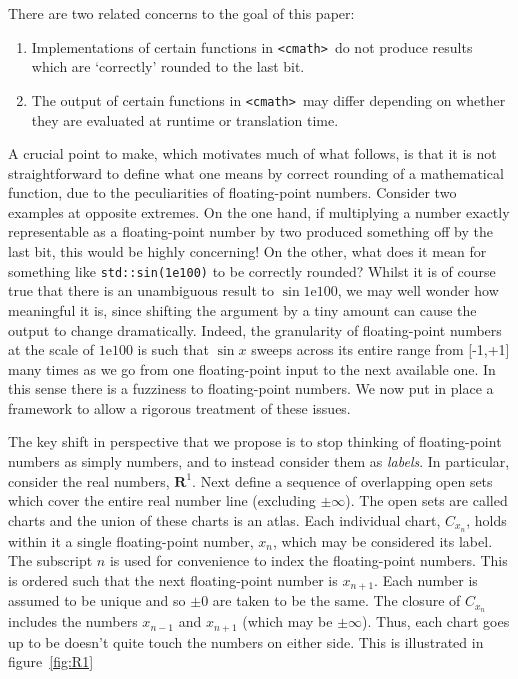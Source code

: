 \documentclass[prd,twocolumn,amsmath,amssymb,nofootinbib,eqsecnum]{revtex4-1}
\newcommand{\code}[1]{{\tt #1}}
\newcommand{\header}[1]{{\tt <#1>}}
\newcommand{\cmath}{\header{cmath}}
\newcommand{\fig}[1]{figure~\ref{fig:#1}}
\begin{document}
There are two related concerns to the goal of this paper:
\begin{enumerate}
	\item Implementations of certain functions in \cmath\ do not produce results which are `correctly' rounded to the last bit.
	
	\item The output of certain functions in \cmath\ may differ depending on whether they are evaluated at runtime or translation time.
\end{enumerate}

A crucial point to make, which motivates much of what follows, is that it is not straightforward to define what one means by correct rounding of a mathematical function, due to the peculiarities of floating-point numbers. Consider two examples at opposite extremes. On the one hand, if multiplying a number exactly representable as a floating-point number by two produced something off by the last bit, this would be highly concerning! On the other, what does it mean for something like \code{std::sin(1e100)} to be correctly rounded? Whilst it is of course true that there is an unambiguous result to $\sin 1\mathrm{e}100$, we may well wonder how meaningful it is, since shifting the argument by a tiny amount can cause the output to change dramatically. Indeed, the granularity of floating-point numbers at the scale of $1\mathrm{e}100$ is such that $\sin x$ sweeps across its entire range from [-1,+1] many times as we go from one floating-point input to the next available one. In this sense there is a fuzziness to floating-point numbers. We now put in place a framework to allow a rigorous treatment of these issues.

The key shift in perspective that we propose is to stop thinking of floating-point numbers as simply numbers, and to instead consider them as {\it labels}. In particular, consider the real numbers, $\mathbf{R}^1$. Next define a sequence of overlapping open sets which cover the entire real number line (excluding $\pm \infty$). The open sets are called charts and the union of these charts is an atlas. Each individual chart, $C_{x_n}$, holds within it a single floating-point number, $x_n$, which may be considered its label. The subscript $n$ is used for convenience to index the floating-point numbers. This is ordered such that the next floating-point number is $x_{n+1}$. Each number is assumed to be unique and so $\pm 0$ are taken to be the same. The closure of 
$C_{x_n}$ includes the numbers $x_{n-1}$ and $x_{n+1}$ (which may be $\pm \infty$). Thus, each chart goes up to be doesn't quite touch the numbers on either side. This is illustrated in \fig{R1}
\end{document}
